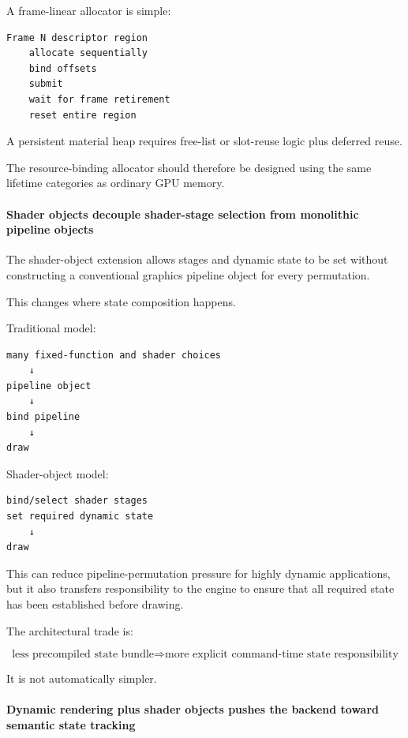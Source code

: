 A frame-linear allocator is simple:

\begin{verbatim}
Frame N descriptor region
    allocate sequentially
    bind offsets
    submit
    wait for frame retirement
    reset entire region
\end{verbatim}

A persistent material heap requires free-list or slot-reuse logic plus deferred reuse.

The resource-binding allocator should therefore be designed using the same lifetime categories as ordinary GPU memory.

\paragraph{Shader objects decouple shader-stage selection from monolithic pipeline objects}\label{shader-objects-decouple-shader-stage-selection-from-monolithic-pipeline-objects}

The shader-object extension allows stages and dynamic state to be set without constructing a conventional graphics pipeline object for every permutation.

This changes where state composition happens.

Traditional model:

\begin{verbatim}
many fixed-function and shader choices
    ↓
pipeline object
    ↓
bind pipeline
    ↓
draw
\end{verbatim}

Shader-object model:

\begin{verbatim}
bind/select shader stages
set required dynamic state
    ↓
draw
\end{verbatim}

This can reduce pipeline-permutation pressure for highly dynamic applications, but it also transfers responsibility to the engine to ensure that all required state has been established before drawing.

The architectural trade is:

\[
\boxed{
\text{less precompiled state bundle}
\Rightarrow
\text{more explicit command-time state responsibility}
}
\]

It is not automatically simpler.

\paragraph{Dynamic rendering plus shader objects pushes the backend toward semantic state tracking}\label{dynamic-rendering-plus-shader-objects-pushes-the-backend-toward-semantic-state-tracking}

